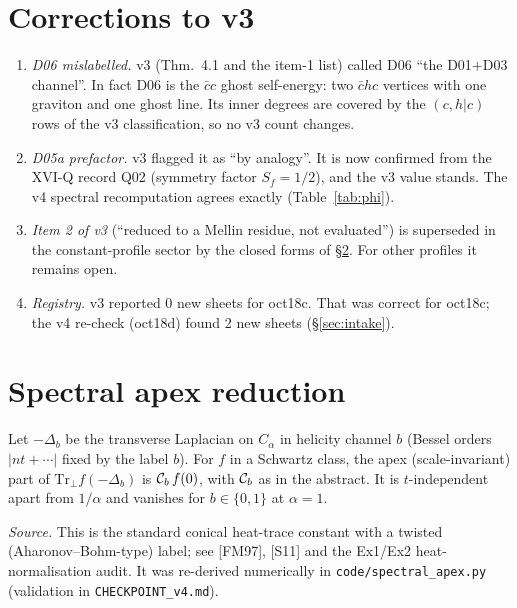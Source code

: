 \section{Corrections to v3}\label{sec:corr}
\begin{enumerate}
\item \emph{D06 mislabelled.} v3 (Thm.~4.1 and the item-1 list) called D06 ``the D01$+$D03 channel''. In fact D06 is the $\bar cc$ ghost self-energy: two $\bar c h c$ vertices with one graviton and one ghost line. Its inner degrees are covered by the $(c,h|c)$ rows of the v3 classification, so no v3 count changes.
\item \emph{D05a prefactor.} v3 flagged it as ``by analogy''. It is now confirmed from the XVI-Q record Q02 (symmetry factor $S_f=1/2$), and the v3 value stands. The v4 spectral recomputation agrees exactly (Table~\ref{tab:phi}).
\item \emph{Item 2 of v3} (``reduced to a Mellin residue, not evaluated'') is superseded in the constant-profile sector by the closed forms of \S\ref{sec:spec}. For other profiles it remains open.
\item \emph{Registry.} v3 reported 0 new sheets for oct18c. That was correct for oct18c; the v4 re-check (oct18d) found 2 new sheets (\S\ref{sec:intake}).
\end{enumerate}

\section{Spectral apex reduction}\label{sec:spec}
\begin{proposition}\label{prop:C}
Let $-\Delta_b$ be the transverse Laplacian on $C_\alpha$ in helicity channel $b$ (Bessel orders $|n t+\cdots|$ fixed by the label $b$). For $f$ in a Schwartz class, the apex (scale-invariant) part of $\mathrm{Tr}_\perp f(-\Delta_b)$ is $\mathcal C_b\,f(0)$, with $\mathcal C_b$ as in the abstract. It is $t$-independent apart from $1/\alpha$ and vanishes for $b\in\{0,1\}$ at $\alpha=1$.
\end{proposition}
\emph{Source.} This is the standard conical heat-trace constant with a twisted (Aharonov--Bohm-type) label; see [FM97], [S11] and the Ex1/Ex2 heat-normalisation audit. It was re-derived numerically in \texttt{code/spectral\_apex.py} (validation in \texttt{CHECKPOINT\_v4.md}).

